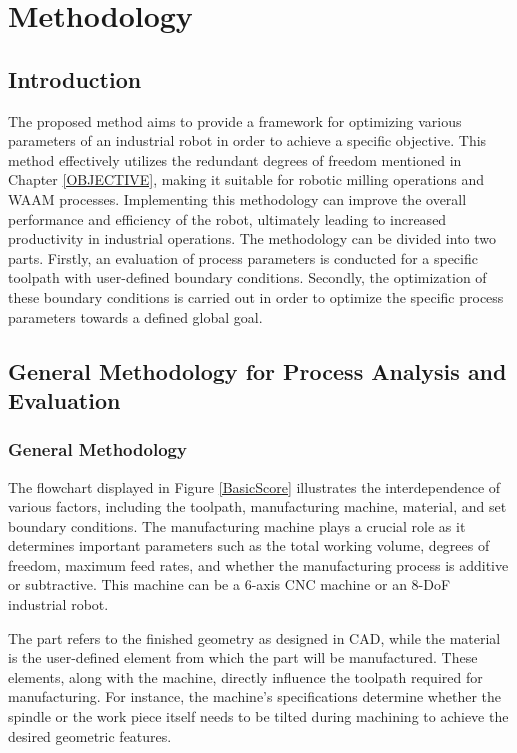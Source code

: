 \chapter{Methodology}\label{METmain}

\section{Introduction}%

The proposed method aims to provide a framework for optimizing various parameters of an industrial robot in order to achieve a specific objective. This method effectively utilizes the redundant degrees of freedom mentioned in Chapter \ref{OBJECTIVE}, making it suitable for robotic milling operations and \acrshort{WAAM} processes. Implementing this methodology can improve the overall performance and efficiency of the robot, ultimately leading to increased productivity in industrial operations. The methodology can be divided into two parts. Firstly, an evaluation of process parameters is conducted for a specific toolpath with user-defined boundary conditions. Secondly, the optimization of these boundary conditions is carried out in order to optimize the specific process parameters towards a defined global goal.

\section{General Methodology for Process Analysis and Evaluation}
\subsection{General Methodology}\label{general}

The flowchart displayed in Figure \ref{BasicScore} illustrates the interdependence of various factors, including the toolpath, manufacturing machine, material, and set boundary conditions. The manufacturing machine plays a crucial role as it determines important parameters such as the total working volume, degrees of freedom, maximum feed rates, and whether the manufacturing process is additive or subtractive. This machine can be a 6-axis CNC machine or an 8-\acrshort{DoF} industrial robot.

The part refers to the finished geometry as designed in \acrshort{CAD}, while the material is the user-defined element from which the part will be manufactured. These elements, along with the machine, directly influence the toolpath required for manufacturing. For instance, the machine's specifications determine whether the spindle or the work piece itself needs to be tilted during machining to achieve the desired geometric features.

